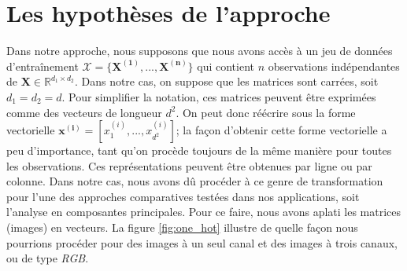 \section{Les hypothèses de l'approche}

Dans notre approche, nous supposons que  nous avons accès à un jeu de données d'entraînement $\mathcal{X} = \{\boldsymbol{X^{(1)}}, ..., \boldsymbol{X^{(n)}}\}$ qui contient $n$ observations indépendantes de $\mathbf{X} \in \mathbb{R}^{d_1 \times d_2}$. Dans notre cas, on suppose que les matrices sont carrées, soit $d_1=d_2=d$. Pour simplifier la notation, ces matrices peuvent être exprimées comme des vecteurs de longueur $d^2$. On peut donc réécrire sous la forme vectorielle $\boldsymbol{x^{(i)}} = [x^{(i)}_1,...,x^{(i)}_{d^2}]$; la façon d'obtenir cette forme vectorielle a peu d'importance, tant qu'on procède toujours de la même manière pour toutes les observations. Ces représentations peuvent être obtenues par ligne ou par colonne. Dans notre cas, nous avons dû procéder à ce genre de transformation pour l'une des approches comparatives testées dans nos applications, soit l'analyse en composantes principales. Pour ce faire, nous avons aplati les matrices (images) en vecteurs. La figure \ref{fig:one_hot} illustre de quelle façon nous pourrions procéder pour des images à un seul canal et des images à trois canaux, ou de type \textit{RGB}.

